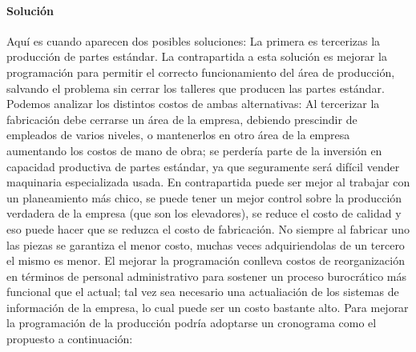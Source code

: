 \documentclass[12pt,a4paper,spanish]{article}
\begin{document}
\paragraph{Soluci\'on}
Aqu\'i es cuando aparecen dos posibles soluciones: La primera es tercerizas la producci\'on de partes est\'andar. La contrapartida a esta soluci\'on es mejorar la programaci\'on para permitir el correcto funcionamiento del \'area de producci\'on, salvando el problema sin cerrar los talleres que producen las partes est\'andar. 
Podemos analizar los distintos costos de ambas alternativas:
Al tercerizar la fabricaci\'on debe cerrarse un \'area de la empresa, debiendo prescindir de empleados de varios niveles, o mantenerlos en otro \'area de la empresa aumentando los costos de mano de obra; se perder\'ia parte de la inversi\'on en capacidad productiva de partes est\'andar, ya que seguramente ser\'a dif\'icil vender maquinaria especializada usada. En contrapartida puede ser mejor al trabajar con un planeamiento m\'as chico, se puede tener un mejor control sobre la producci\'on verdadera de la empresa (que son los elevadores), se reduce el costo de calidad y eso puede hacer que se reduzca el costo de fabricaci\'on. No siempre al fabricar uno las piezas se garantiza el menor costo, muchas veces adquiriendolas de un tercero el mismo es menor.
El mejorar la programaci\'on conlleva costos de reorganizaci\'on en t\'erminos de personal administrativo para sostener un proceso burocr\'atico m\'as funcional que el actual; tal vez sea necesario una actualiaci\'on de los sistemas de informaci\'on de la empresa, lo cual puede ser un costo bastante alto.
Para mejorar la programaci\'on de la producci\'on podr\'ia adoptarse un cronograma como el propuesto a continuaci\'on:
\end{document}
